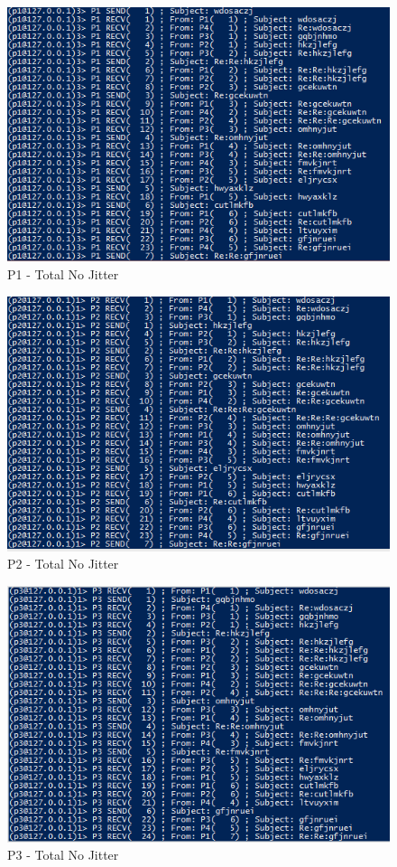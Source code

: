 \begin{figure}[h!]
\centering
\includegraphics[scale=0.9]{sections/screenshots/totalP1_noJitter.PNG}
\caption{P1 - Total No Jitter}
\label{fig:p1_Total_noJitter}
\end{figure}

\begin{figure}[h!]
\centering
\includegraphics[scale=0.9]{sections/screenshots/totalP2_noJitter.PNG}
\caption{P2 - Total No Jitter}
\label{fig:p2_Total_noJitter}
\end{figure}

\begin{figure}[h!]
\centering
\includegraphics[scale=0.9]{sections/screenshots/totalP3_noJitter.PNG}
\caption{P3 - Total No Jitter}
\label{fig:p3_Total_noJitter}
\end{figure}

